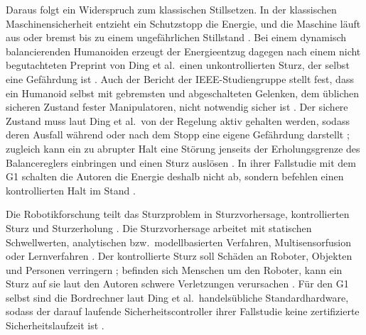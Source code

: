Daraus folgt ein Widerspruch zum klassischen Stillsetzen.
In der klassischen Maschinensicherheit entzieht ein Schutzstopp die Energie, und die Maschine läuft aus oder bremst bis zu einem ungefährlichen Stillstand \cite{Ding2026}.
Bei einem dynamisch balancierenden Humanoiden erzeugt der Energieentzug dagegen nach einem nicht begutachteten Preprint von Ding et al.\ einen unkontrollierten Sturz, der selbst eine Gefährdung ist \cite{Ding2026}.
Auch der Bericht der IEEE-Studiengruppe stellt fest, dass ein Humanoid selbst mit gebremsten und abgeschalteten Gelenken, dem üblichen sicheren Zustand fester Manipulatoren, nicht notwendig sicher ist \cite{Prather2025}.
Der sichere Zustand muss laut Ding et al.\ von der Regelung aktiv gehalten werden, sodass deren Ausfall während oder nach dem Stopp eine eigene Gefährdung darstellt \cite{Ding2026}; zugleich kann ein zu abrupter Halt eine Störung jenseits der Erholungsgrenze des Balancereglers einbringen und einen Sturz auslösen \cite{Ding2026}.
In ihrer Fallstudie mit dem G1 schalten die Autoren die Energie deshalb nicht ab, sondern befehlen einen kontrollierten Halt im Stand \cite{Ding2026}.

Die Robotikforschung teilt das Sturzproblem in Sturzvorhersage, kontrollierten Sturz und Sturzerholung \cite{Subburaman2023}.
Die Sturzvorhersage arbeitet mit statischen Schwellwerten, analytischen bzw.\ modellbasierten Verfahren, Multisensorfusion oder Lernverfahren \cite{Subburaman2023}.
Der kontrollierte Sturz soll Schäden an Roboter, Objekten und Personen verringern \cite{Subburaman2023}; befinden sich Menschen um den Roboter, kann ein Sturz auf sie laut den Autoren schwere Verletzungen verursachen \cite{Subburaman2023}.
Für den G1 selbst sind die Bordrechner laut Ding et al.\ handelsübliche Standardhardware, sodass der darauf laufende Sicherheitscontroller ihrer Fallstudie keine zertifizierte Sicherheitslaufzeit ist \cite{Ding2026}.

